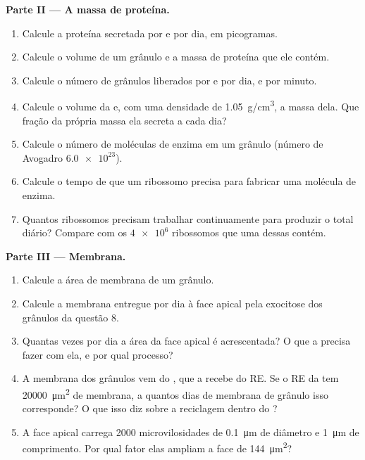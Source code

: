\begin{problem}
\medskip
\noindent\textbf{Parte II --- A massa de proteína.}
\begin{enumerate}[resume]
  \item Calcule a proteína secretada por  e por dia, em
        picogramas.
  \item Calcule o volume de um grânulo e a massa de proteína que ele
        contém.
  \item Calcule o número de grânulos liberados por  e por dia, e
        por minuto.
  \item Calcule o volume da  e, com uma densidade de
        \qty{1.05}{g/cm^3}, a massa dela. Que fração da própria massa
        ela secreta a cada dia?
  \item Calcule o número de moléculas de enzima em um grânulo (número de
        Avogadro $\num{6.0e23}$).
  \item Calcule o tempo de que um ribossomo precisa para fabricar uma
        molécula de enzima.
  \item Quantos ribossomos precisam trabalhar continuamente para
        produzir o total diário? Compare com os $\num{4e6}$ ribossomos
        que uma  dessas contém.
\end{enumerate}

\medskip
\noindent\textbf{Parte III --- Membrana.}
\begin{enumerate}[resume]
  \item Calcule a área de membrana de um grânulo.
  \item Calcule a membrana entregue por dia à face apical pela exocitose
        dos grânulos da questão 8.
  \item Quantas vezes por dia a área da face apical é acrescentada? O
        que a  precisa fazer com ela, e por qual processo?
  \item A membrana dos grânulos vem do , que a recebe do RE. Se o
        RE da  tem \qty{20000}{\micro m^2} de membrana, a quantos
        dias de membrana de grânulo isso corresponde? O que isso diz
        sobre a reciclagem dentro do ?
  \item A face apical carrega \qty{2000}{} microvilosidades de
        \qty{0.1}{\micro m} de diâmetro e \qty{1}{\micro m} de
        comprimento. Por qual fator elas ampliam a face de
        \qty{144}{\micro m^2}?
\end{enumerate}


\end{problem}
